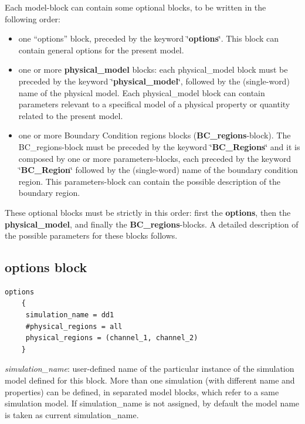 Each model-block can  contain some  optional blocks, to be written in the  following order:
   
   
   
   
\begin{itemize}
	
   \item one    "`options"' block, preceded by the keyword \char`\"{}\textbf{options}\char`\"{}. This block can contain    general  options for the present  model.
	\item  one or more  \textbf{physical\_model} blocks: each physical\_model block must be preceded by the keyword \char`\"{}\textbf{physical\_\-model}\char`\"{}, followed by the (single-word) name of the physical model.
	Each physical\_model block can contain parameters  relevant to a specifical model of a physical property or quantity related to the present model.
\item    one or more  Boundary Condition regions blocks (\textbf{BC\_\-regions}-block).
   The BC\_\-regions-block must be preceded by the keyword \char`\"{}\textbf{BC\_\-Regions}\char`\"{} and it is composed by one or more parameters-blocks, each preceded by the keyword \char`\"{}\textbf{BC\_\-Region}\char`\"{} followed by the (single-word)  name of the boundary condition region. This parameters-block can contain the possible description of the boundary region.
\end{itemize}


 
These optional blocks must be strictly in this order: first the \textbf{options}, then the \textbf{physical\_\-model}, and finally the \textbf{BC\_\-regions}-blocks. A detailed description of the possible parameters for these blocks  follows.



\subsection{options block }

\begin{verbatim}
options
    {
     simulation_name = dd1
     #physical_regions = all
     physical_regions = (channel_1, channel_2)
    }
\end{verbatim}

\textit{simulation\_name}: user-defined name of the particular instance of  the simulation model defined for this block. More than one simulation (with different  name and properties) can be  defined, in separated model blocks, which refer to a same  \TiberCAD{}  simulation model. If simulation\_name is  not assigned,  by default the \TiberCAD{} model name is taken as current simulation\_name.

